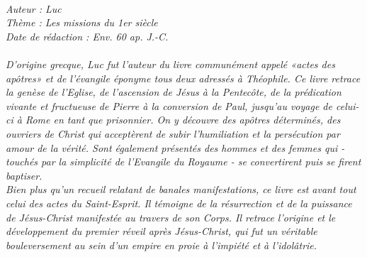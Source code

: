 \BFont
\noindent\hrulefill
{\footnotesize
\textit{
\bigskip
{\centering{}
\\Auteur : Luc
\\Thème : Les missions du 1er siècle
\\Date de rédaction : Env. 60 ap. J.-C.\\}
}
\textit{
\\D'origine grecque, Luc fut l'auteur du livre communément appelé «actes des apôtres» et de l'évangile éponyme tous
deux adressés à Théophile. Ce livre retrace la genèse de l'Eglise, de l'ascension de Jésus à la Pentecôte, de la prédication vivante et fructueuse de Pierre à la conversion de Paul, jusqu'au voyage de celui-ci à Rome en tant que prisonnier. On y découvre des apôtres déterminés, des ouvriers de Christ qui acceptèrent de subir l'humiliation et la persécution par amour de la vérité. Sont également présentés des hommes et des femmes qui - touchés par la simplicité de l'Evangile du Royaume - se convertirent puis se firent baptiser.
\\Bien plus qu'un recueil relatant de banales manifestations, ce livre est avant tout celui des actes du Saint-Esprit. Il témoigne de la résurrection et de la puissance de Jésus-Christ manifestée au travers de son Corps. Il retrace l'origine et le développement du premier réveil après Jésus-Christ, qui fut un véritable bouleversement au sein d'un empire en proie à l'impiété et à l'idolâtrie.\bigskip
}
}
\par\nobreak\noindent\hrulefill
